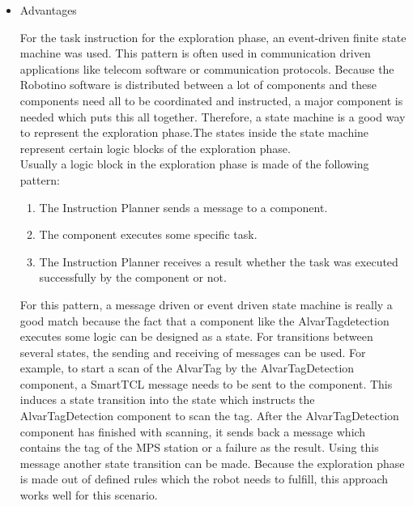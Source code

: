 \begin{itemize}

\item Advantages

For the task instruction for the exploration phase, an event-driven finite state machine was used. This pattern is often used in communication driven applications
like telecom software or communication protocols. Because the Robotino software is distributed between a lot of components and these components need all to be coordinated and instructed, a major component is needed which puts this all together. Therefore, a state machine is a good way to represent the exploration phase.The states inside the state machine represent certain logic blocks of the exploration phase. \\


Usually a logic block in the exploration phase is made of the following pattern:

\begin{enumerate}

\item The Instruction Planner sends a message to a component.

\item The component executes some specific task.

\item The Instruction Planner receives a result whether the task was executed successfully by the 
component or not.  


\end{enumerate}

For this pattern, a message driven or event driven state machine is really a good match because the fact that a component like the AlvarTagdetection executes some logic can be designed as a state. For transitions between several states, the sending and receiving of messages can be used. For example, to start a scan of the AlvarTag by the AlvarTagDetection component, a SmartTCL message needs to be sent to the component. This induces a state transition into the state which instructs the AlvarTagDetection component to scan the tag. After the AlvarTagDetection component has finished with scanning, it sends back a message which contains the tag of the MPS station or a failure as the result. Using this message another state transition can be made. Because the exploration phase is made out of defined rules which the robot needs to fulfill, this approach works well for this scenario. \\



\end{itemize}
